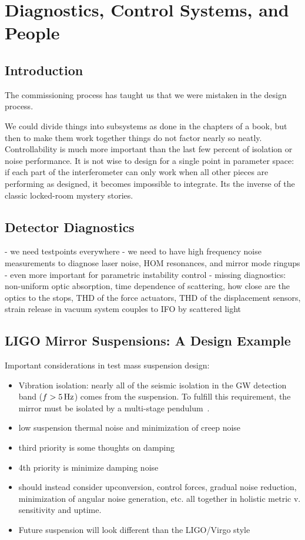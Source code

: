 \chapter[Diagnostics, Control Systems, and People]{Diagnostics, Control Systems, and People\label{ch7}}

\section{Introduction}\label{sec7.1}
The commissioning process has taught us that we were mistaken in the design process.

We could divide things into subsystems as done in the chapters of a book, but then 
to make them work together things do not factor nearly so neatly. Controllability is 
much more important than the last few percent of isolation or noise performance. It
is not wise to design for a single point in parameter space: if each part of the interferometer
can only work when all other pieces are performing as designed, it becomes impossible
to integrate. Its the inverse of the classic locked-room mystery stories.


\section{Detector Diagnostics}
   - we need testpoints everywhere
   - we need to have high frequency noise measurements to diagnose laser noise, HOM resonances, and mirror mode ringups
   - even more important for parametric instability control\cite{Matt:PI}
   - missing diagnostics: non-uniform optic absorption, time dependence of scattering, how close are the optics to the stops, THD of the force actuators, THD of the displacement sensors, strain release in vacuum system couples to IFO by scattered light


\section{LIGO Mirror Suspensions: A Design Example}

Important considerations in test mass suspension design\cite{SUS:2012, Aston:2012}:
\begin{itemize}
   \item Vibration isolation: nearly all of the seismic isolation in the GW detection band ($f > 5\,\rm Hz$)
     comes from the suspension. To fulfill this requirement, the mirror must be isolated by a 
     multi-stage pendulum~\cite{Beker:2011}.
    \item low suspension thermal noise and minimization of creep noise~\cite{Levin:2012ek, Gretarsson:2005gs}
    \item third priority is some thoughts on damping
    \item 4th priority is minimize damping noise
    \item should instead consider upconversion, control forces, gradual noise reduction, minimization of angular noise generation, etc. all together in holistic metric v. sensitivity and uptime.
    \item Future suspension will look different than the LIGO/Virgo style
\end{itemize}

